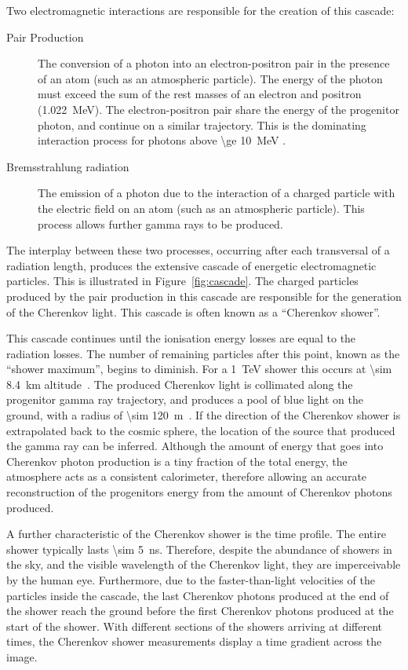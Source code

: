 Two electromagnetic interactions are responsible for the creation of this cascade:
\begin{description}
\item [Pair Production] The conversion of a photon into an electron-positron pair in the presence of an atom (such as an atmospheric particle). The energy of the photon must exceed the sum of the rest masses of an electron and positron (\SI{1.022}{MeV}). The electron-positron pair share the energy of the progenitor photon, and continue on a similar trajectory. This is the dominating interaction process for photons above \SI{\ge 10}{MeV} \cite{Weekes2003}.
\item [Bremsstrahlung radiation] The emission of a photon due to the interaction of a charged particle with the electric field on an atom (such as an atmospheric particle). This process allows further gamma rays to be produced.
\end{description}
The interplay between these two processes, occurring after each transversal of a radiation length, produces the extensive cascade of energetic electromagnetic particles. This is illustrated in Figure~\ref{fig:cascade}. The charged particles produced by the pair production in this cascade are responsible for the generation of the Cherenkov light. This cascade is often known as a ``Cherenkov shower''.

This cascade continues until the ionisation energy losses are equal to the radiation losses. The number of remaining particles after this point, known as the ``shower maximum'', begins to diminish. For a \SI{1}{TeV} shower this occurs at \SI{\sim 8.4}{km} altitude~\cite{Weekes2003}. The produced Cherenkov light is collimated along the progenitor gamma ray trajectory, and produces a pool of blue light on the ground, with a radius of \SI{\sim 120}{m}~\cite{Hillas1996a}. If the direction of the Cherenkov shower is extrapolated back to the cosmic sphere, the location of the source that produced the gamma ray can be inferred. Although the amount of energy that goes into Cherenkov photon production is a tiny fraction of the total energy, the atmosphere acts as a consistent calorimeter, therefore allowing an accurate reconstruction of the progenitors energy from the amount of Cherenkov photons produced. 

A further characteristic of the Cherenkov shower is the time profile. The entire shower typically lasts \SI{\sim 5}{ns}. Therefore, despite the abundance of showers in the sky, and the visible wavelength of the Cherenkov light, they are imperceivable by the human eye. Furthermore, due to the faster-than-light velocities of the particles inside the cascade, the last Cherenkov photons produced at the end of the shower reach the ground before the first Cherenkov photons produced at the start of the shower. With different sections of the showers arriving at different times, the Cherenkov shower measurements display a time gradient across the image. 

